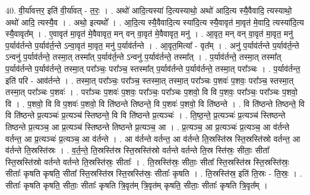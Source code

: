 \documentclass[17pt]{extarticle}
\begin{document}
40. वी॒र्या॑वत्तर॒ इति॑ वी॒र्या॑वत् - त॒रः॒ । . अथो॑ आदि॒त्यस्या॑ दि॒त्यस्याथो॒ अथो॑ आदि॒त्य स्यै॒वैवादि॒ त्यस्याथो॒ अथो॑ आदि॒ त्यस्यै॒व । . अथो॒ इत्यथो᳚ । . आ॒दि॒त्य स्यै॒वैवादि॒त्य स्या॑दि॒त्य स्यै॒वावृत॑ मा॒वृत॑ मे॒वादि॒ त्यस्या॑दि॒त्य स्यै॒वावृत᳚म् । . ए॒वावृत॑ मा॒वृत॑ मे॒वैवावृत॒ मन् वन् वा॒वृत॑ मे॒वैवावृत॒ मनु॑ । . आ॒वृत॒ मन् वन् वा॒वृत॑ मा॒वृत॒ मनु॑ प॒र्याव॑र्तन्ते प॒र्याव॑र्त॒न्ते ऽन्वा॒वृत॑ मा॒वृत॒ मनु॑ प॒र्याव॑र्तन्ते । . आ॒वृत॒मित्या᳚ - वृत᳚म् । . अनु॑ प॒र्याव॑र्तन्ते प॒र्याव॑र्त॒न्ते ऽन्वनु॑ प॒र्याव॑र्तन्ते॒ तस्मा॒त् तस्मा᳚त् प॒र्याव॑र्त॒न्ते ऽन्वनु॑ प॒र्याव॑र्तन्ते॒ तस्मा᳚त् । . प॒र्याव॑र्तन्ते॒ तस्मा॒त् तस्मा᳚त् प॒र्याव॑र्तन्ते प॒र्याव॑र्तन्ते॒ तस्मा॒त् परा᳚ञ्चः॒ परा᳚ञ्च॒ स्तस्मा᳚त् प॒र्याव॑र्तन्ते प॒र्याव॑र्तन्ते॒ तस्मा॒त् परा᳚ञ्चः । . प॒र्याव॑र्तन्त॒ इति॑ परि - आव॑र्तन्ते । . तस्मा॒त् परा᳚ञ्चः॒ परा᳚ञ्च॒ स्तस्मा॒त् तस्मा॒त् परा᳚ञ्चः प॒शवः॑ प॒शवः॒ परा᳚ञ्च॒ स्तस्मा॒त् तस्मा॒त् परा᳚ञ्चः प॒शवः॑ । . परा᳚ञ्चः प॒शवः॑ प॒शवः॒ परा᳚ञ्चः॒ परा᳚ञ्चः प॒शवो॒ वि वि प॒शवः॒ परा᳚ञ्चः॒ परा᳚ञ्चः प॒शवो॒ वि । . प॒शवो॒ वि वि प॒शवः॑ प॒शवो॒ वि ति॑ष्ठन्ते तिष्ठन्ते॒ वि प॒शवः॑ प॒शवो॒ वि ति॑ष्ठन्ते । . वि ति॑ष्ठन्ते तिष्ठन्ते॒ वि वि ति॑ष्ठन्ते प्र॒त्यञ्चः॑ प्र॒त्यञ्च॑ स्तिष्ठन्ते॒ वि वि ति॑ष्ठन्ते प्र॒त्यञ्चः॑ । . ति॒ष्ठ॒न्ते॒ प्र॒त्यञ्चः॑ प्र॒त्यञ्च॑ स्तिष्ठन्ते तिष्ठन्ते प्र॒त्यञ्च॒ आ प्र॒त्यञ्च॑ स्तिष्ठन्ते तिष्ठन्ते प्र॒त्यञ्च॒ आ । . प्र॒त्यञ्च॒ आ प्र॒त्यञ्चः॑ प्र॒त्यञ्च॒ आ व॑र्तन्ते वर्तन्त॒ आ प्र॒त्यञ्चः॑ प्र॒त्यञ्च॒ आ व॑र्तन्ते । . आ व॑र्तन्ते वर्तन्त॒ आ व॑र्तन्ते ति॒स्रस्ति॑स्र स्ति॒स्रस्ति॑स्रो वर्तन्त॒ आ व॑र्तन्ते ति॒स्रस्ति॑स्रः । . व॒र्त॒न्ते॒ ति॒स्रस्ति॑स्र स्ति॒स्रस्ति॑स्रो वर्तन्ते वर्तन्ते ति॒स्र स्ति॑स्रः॒ सीताः॒ सीता᳚ स्ति॒स्रस्ति॑स्रो वर्तन्ते वर्तन्ते ति॒स्रस्ति॑स्रः॒ सीताः᳚ । . ति॒स्रस्ति॑स्रः॒ सीताः॒ सीता᳚ स्ति॒स्रस्ति॑स्र स्ति॒स्रस्ति॑स्रः॒ सीताः᳚ कृषति कृषति॒ सीता᳚ स्ति॒स्रस्ति॑स्र स्ति॒स्रस्ति॑स्रः॒ सीताः᳚ कृषति । . ति॒स्रस्ति॑स्र॒ इति॑ ति॒स्रः - ति॒स्रः॒ । . सीताः᳚ कृषति कृषति॒ सीताः॒ सीताः᳚ कृषति त्रि॒वृत॑म् त्रि॒वृत॑म् कृषति॒ सीताः॒ सीताः᳚ कृषति त्रि॒वृत᳚म् । \newline
\pagebreak
{}
\end{document}
